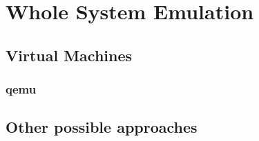\chapter{Whole System Emulation}

\section{Virtual Machines}

\subsection{qemu}

\section{Other possible approaches}
